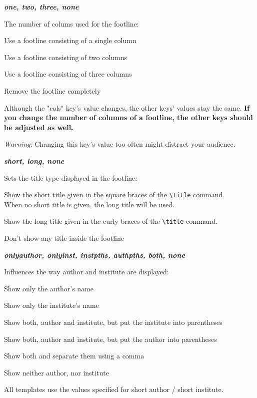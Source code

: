 \documentclass[11pt]{ltxdoc}
\newcommand{\DescribeOption}[3]{
  \DescribeMacro{#1}
  \begin{minipage}[t]{\textwidth}
    \textit{\textbf{#2}}\dotfill~\par
    \begingroup
    \vspace{0.5em}#3\par
    \endgroup
  \end{minipage}%
  \bigskip\medskip%
}
\begin{document}
	\bigskip
	\DescribeOption{cols}{one, two, three, none}{%
		The number of colums used for the footline:
		\begin{description}\itemsep0pt
			\item[one]
				Use a footline consisting of a single column
			\item[two]
				Use a footline consisting of two columns
			\item[three]
				Use a footline consisting of three columns
			\item[none]
				Remove the footline completely
		\end{description}
		
		Although the "cols" key's value changes, the other keys' values stay the same. \textbf{If you change the number of columns of a footline, the other keys should be adjusted as well.}
		
		\medskip
		\emph{Warning:} Changing this key's value too often might distract your audience.
	}
	
	\DescribeOption{title}{short, long, none}{%
		Sets the title type displayed in the footline:
		\begin{description}\itemsep0pt
			\item[short]
				Show the short title given in the square braces of the \texttt{\textbackslash title} command. \\
				When no short title is given, the long title will be used.
			\item[long]
				Show the long title given in the curly braces of the \texttt{\textbackslash title} command.
			\item[none]
				Don't show any title inside the footline
		\end{description}}
	
	\DescribeOption{authinst}{onlyauthor, onlyinst, instpths, authpths, both, none}{%
		Influences the way author and institute are displayed:
		\begin{description}\itemsep0pt
			\item[onlyauthor]
				Show only the author's name
			\item[onlyinst]
				Show only the institute's name
			\item[instpths]
				Show both, author and institute, but put the institute into parentheses
			\item[authpths]
				Show both, author and institute, but put the author into parentheses
			\item[both]
				Show both and separate them using a comma
			\item[none]
				Show neither author, nor institute
		\end{description}
		All templates use the values specified for short author / short institute.
	}
	
\end{document}
